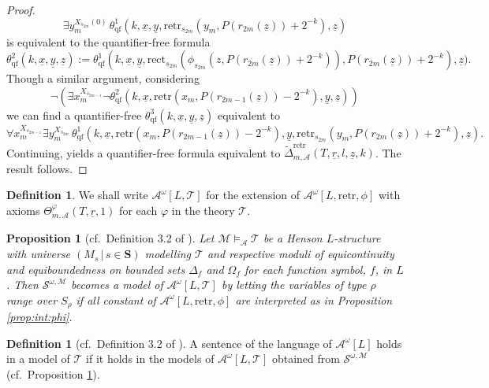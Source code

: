 \documentclass[11pt]{amsart}
\newtheorem{proposition}[theorem]{Proposition}
\theoremstyle{definition}
\newtheorem{definition}[theorem]{Definition}
\theoremstyle{remark}
\begin{document}
\begin{proof}
\[
 \exists y_m^{X_{s_{2m}}(0)}\,\theta^1_{\mathrm{qf}}(k,\underline{x},\underline{y},\mathrm{retr}_{s_{2m}}(y_{m},P(r_{2m}(\underline{z}))+2^{-k}),\underline{z})
\]
is equivalent to the quantifier-free formula
\[
\theta^2_\mathrm{qf}(k,\underline{x},\underline{y},\underline{z}):=\theta^1_{\mathrm{qf}}(k,\underline{x},\underline{y},\mathrm{rect}_{s_{2m}}(\phi_{s_{2m}}(z,P(r_{2m}(\underline{z}))+2^{-k})),P(r_{2m}(\underline{z}))+2^{-k}),\underline{z}).
\]
Though a similar argument, considering 
\[
\neg(\exists x_m^{X_{s_{2m-1}}} \neg \theta^2_\mathrm{qf}(k,\underline{x},\mathrm{retr}(x_m,P(r_{2m-1}(\underline{z}))-2^{-k}),\underline{y},\underline{z})) 
\]
we can find a quantifier-free $\theta^3_\mathrm{qf}(k,\underline{x},\underline{y},\underline{z})$ equivalent to
\[
 \forall x_m^{X_{s_{2m-1}}}\exists y_m^{X_{s_{2m}}}\,\theta^1_{\mathrm{qf}}(k,\underline{x},\mathrm{retr}(x_m,P(r_{2m-1}(\underline{z}))-2^{-k}),\underline{y},\mathrm{retr}_{s_{2m}}(y_{m},P(r_{2m}(\underline{z}))+2^{-k}),\underline{z}).
\]
Continuing, yields a quantifier-free formula equivalent to $\tilde{\Delta}^\mathrm{retr}_{m,\mathcal{A}}(T,\underline{r},l,\underline{z},k)$. The result follows. 
\end{proof}

\begin{definition}
    We shall write $\mathcal{A}^\omega[L,\mathcal{T}]$ for the extension of $\mathcal{A}^\omega[L,\mathrm{retr},\phi]$ with axioms $\Theta_{m,\mathcal{A}}^\varphi(T,\underline{r},1)$ for each $\varphi$ in the theory $\mathcal{T}$.
\end{definition}

\begin{proposition}[cf.\ Definition 3.2 of \cite{kohlenbach2005some}]
\label{prop:model:set:T}
 Let $\mathscr{M}\models_\mathcal{A} \mathcal{T}$ be a Henson $L$-structure with universe $(M_s\,|\, s \in \mathbf{S})$ modelling $\mathcal{T}$ and respective moduli of equicontinuity and equiboundedness on
bounded sets $\Delta_f$ and $\Omega_f$ for each function symbol, $f$, in $L$. Then $\mathcal{S}^{\omega,\mathscr{M}}$ becomes a model of $\mathcal{A}^\omega[L,\mathcal{T}]$ by letting the variables of type $\rho$ range over $S_\rho$ if all constant of $\mathcal{A}^\omega[L,\mathrm{retr},\phi]$ are interpreted as in Proposition \ref{prop:int:phi}.
\end{proposition}

\begin{definition}[cf.\ Definition 3.2 of \cite{kohlenbach2005some}]
     A sentence of the language of $\mathcal{A}^\omega[L]$ holds in a model of $\mathcal{T}$ if it holds in the models of $\mathcal{A}^\omega[L,\mathcal{T}]$ obtained from $\mathcal{S}^{\omega,\mathscr{M}}$ (cf.\ Proposition \ref{prop:model:set:T}).
\end{definition}
\end{document}
